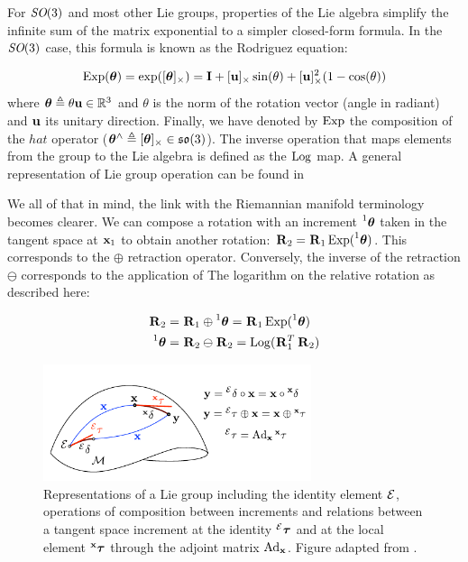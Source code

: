 For $\textit{SO}(3)$ and most other Lie groups, properties of the Lie algebra simplify the infinite sum of the matrix exponential to a simpler closed-form formula. 
In the $\textit{SO}(3)$ case, this formula is known as the Rodriguez equation:

\begin{equation}
    \operatorname*{Exp}({\bm \theta}) = \exp([{\bm \theta}]_{\times}) = {\bf I} + [{\bf u}]_{\times}\sin(\theta) + [{\bf u}]_{\times}^2(1 - \cos(\theta))
\end{equation}
%
where ${\bm \theta} \triangleq \theta {\bf u} \in \mathbb{R}^3$ and $\theta$ is the norm of the rotation vector (angle in radiant) and ${\bf u}$ its unitary direction.
Finally, we have denoted by $\operatorname*{Exp}$ the composition of the $hat$ operator (${\bm \theta}^\wedge \triangleq [{\bm \theta}]_{\times} \in {\mathfrak {so}}(3)$). 
The inverse operation that maps elements from the group to the Lie algebra is defined as the $\operatorname*{Log}$ map. A general representation of
Lie group operation can be found in 

We all of that in mind, the link with the Riemannian manifold terminology becomes clearer. We can compose a rotation with
an increment $\prescript{1}{}{{\bm \theta}}$ taken in the tangent space at ${\bf x}_1$ to obtain another rotation: $\prescript{}{}{{\bf R}}_{2} = \prescript{}{}{{\bf R}}_{1}\operatorname*{Exp}(\prescript{1}{}{{\bm \theta}})$.
This corresponds to the $\oplus$ retraction operator. Conversely, the inverse of the retraction $\ominus$ corresponds to the application of The
logarithm on the relative rotation as described here:

\begin{align}
    \Rot{}{2} &= \Rot{}{1}\oplus \prescript{1}{}{\bftheta} = \Rot{}{1} \Exp(\prescript{1}{}{\bftheta})  \\ 
    \prescript{1}{}{\bftheta} &= \Rot{}{2}\ominus \Rot{}{2} = \Log(\Rot{}{1}^T\Rot{}{2}) 
\end{align}

\begin{figure}[h]
    \centering
    \includegraphics[width=0.7\textwidth]{figures/lie_group.pdf}
    \caption{Representations of a Lie group including the identity element $\mathcal{E}$, operations of composition
    between increments and relations between a tangent space increment at the identity $\prescript{\mathcal{E}}{}{{\bm \tau}}$ 
    and at the local element $\prescript{{\bf x}}{}{{\bm \tau}}$ through the adjoint matrix $\text{Ad}_{{\bf x}}$. Figure adapted from \cite{sola2018micro}.}
    \label{fig:lie_group} 
\end{figure}

